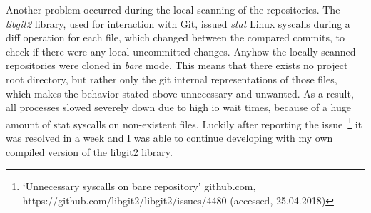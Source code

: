 Another problem occurred during the local scanning of the repositories.
The \emph{libgit2} library, used for interaction with Git, issued \emph{stat} Linux syscalls during a diff operation for each file, which changed between the compared commits, to check if there were any local uncommitted changes.
Anyhow the locally scanned repositories were cloned in \emph{bare} mode.
This means that there exists no project root directory, but rather only the git internal representations of those files, which makes the behavior stated above unnecessary and unwanted.
As a result, all processes slowed severely down due to high \ac{io} wait times, because of a huge amount of stat syscalls on non-existent files.
Luckily after reporting the issue~\footnote{`Unnecessary syscalls on bare repository' github.com, https://github.com/libgit2/libgit2/issues/4480 (accessed, 25.04.2018)} it was resolved in a week and I was able to continue developing with my own compiled version of the libgit2 library.
